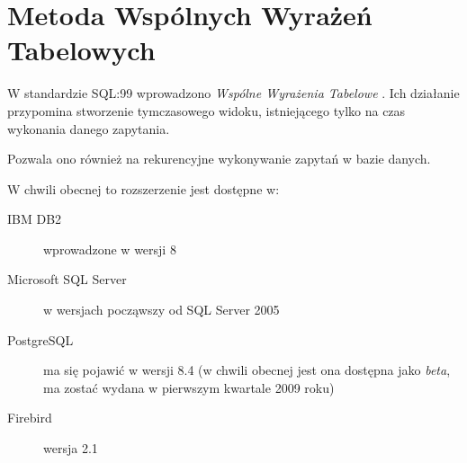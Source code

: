 \section{Metoda Wspólnych Wyrażeń Tabelowych}







W standardzie SQL:99 wprowadzono \emph{Wspólne Wyrażenia Tabelowe} .
Ich działanie przypomina stworzenie tymczasowego widoku, 
istniejącego tylko na czas wykonania danego zapytania.


Pozwala ono również na rekurencyjne wykonywanie zapytań w bazie danych.

W chwili obecnej to rozszerzenie jest dostępne w:
\begin{description}
 \item[IBM DB2]
    wprowadzone w wersji 8
 \item[Microsoft SQL Server]
	w wersjach począwszy od SQL Server 2005
 \item[PostgreSQL]
	ma się pojawić w wersji 8.4 (w chwili obecnej jest ona dostępna jako \emph{beta}, ma zostać wydana w pierwszym kwartale 2009 roku)
 \item[Firebird]
	wersja 2.1 
\end{description}


